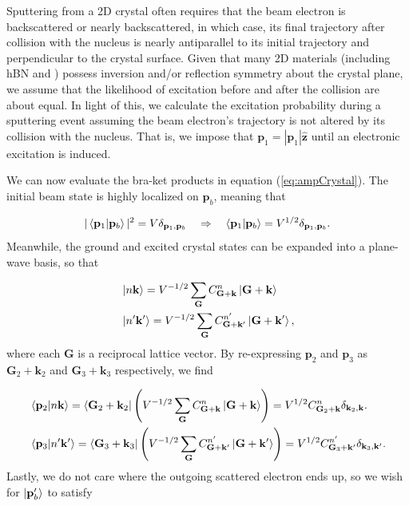 \documentclass[twoside,twocolumn,9pt]{article}
\begin{document}
Sputtering from a 2D crystal often requires that the beam electron is
backscattered or nearly backscattered, in which case, its final trajectory
after collision with the nucleus is nearly antiparallel to its initial
trajectory and perpendicular to the crystal surface.
Given that many 2D materials (including hBN and ) possess inversion
and/or reflection symmetry about the crystal plane, we assume that the
likelihood of excitation before and after the collision are about equal.
In light of this, we calculate the excitation probability during a sputtering event
assuming the beam electron's trajectory is not altered by its collision with
the nucleus.
That is, we impose that $\mathbf{p}_1 = |\mathbf{p}_1|\hat{\mathbf{z}}$ until
an electronic excitation is induced.

We can now evaluate the bra-ket products in equation (\ref{eq:ampCrystal}).
The initial beam state is highly localized on $\mathbf{p}_b$, meaning that

\begin{equation} 
  \label{eq:phi_1}
    |\bra{\mathbf{p}_1}\ket{\mathbf{p}_b}|^2
    =
    V\delta_{\mathbf{p}_1,\mathbf{p}_b}
    \quad\Rightarrow\quad
    \bra{\mathbf{p}_1}\ket{\mathbf{p}_b}
    =
    V^{1/2}\delta_{\mathbf{p}_1,\mathbf{p}_b}.
\end{equation}
%
Meanwhile, the ground and excited crystal states can be expanded into a
plane-wave basis, so that

\begin{equation} 
  \begin{aligned}
    &\ket{n\mathbf{k}}
    =
    V^{-1/2}\sum_{\mathbf{G}}
    C_{\mathbf{G+k}}^n \ket{\mathbf{G+k}}
    \\& \ket{n'\mathbf{k'}}
    =
    V^{-1/2}\sum_{\mathbf{G}} C_{\mathbf{G+k'}}^{n'} \ket{\mathbf{G+k'}},
  \end{aligned}
\end{equation}
%
where each $\mathbf{G}$ is a reciprocal lattice vector.
By re-expressing $\mathbf{p}_2$ and $\mathbf{p}_3$ as $\mathbf{G}_2+\mathbf{k}_2$ and
$\mathbf{G}_3 + \mathbf{k}_3$ respectively, we find

\begin{equation} 
  \label{eq:phi_2} 
  \begin{aligned}
    &\bra{\mathbf{p}_2}\ket{n\mathbf{k}}
    =
    \bra{\mathbf{G}_2 + \mathbf{k}_2}
    \left(
        V^{-1/2}\sum_{\mathbf{G}}
        C_{\mathbf{G+k}}^n \ket{\mathbf{G+k}}
    \right)
    =
    V^{1/2}C^n_{\mathbf{G}_2+\mathbf{k}}
    \delta_{\mathbf{k}_2,\mathbf{k}}.
    \\&
    \bra{\mathbf{p}_3}\ket{n'\mathbf{k'}}
    =
    \bra{\mathbf{G}_3 + \mathbf{k}_3}
    \left(
        V^{-1/2}\sum_{\mathbf{G}}
        C_{\mathbf{G+k'}}^{n'} \ket{\mathbf{G+k'}}
    \right)
    =
    V^{1/2}C^{n'}_{\mathbf{G}_3+\mathbf{k'}}
    \delta_{\mathbf{k}_3,\mathbf{k'}}.
  \end{aligned}
\end{equation}
%
Lastly, we do not care where the outgoing scattered electron ends up, so we
wish for $\ket{\mathbf{p}_b'}$ to satisfy
\end{document}
